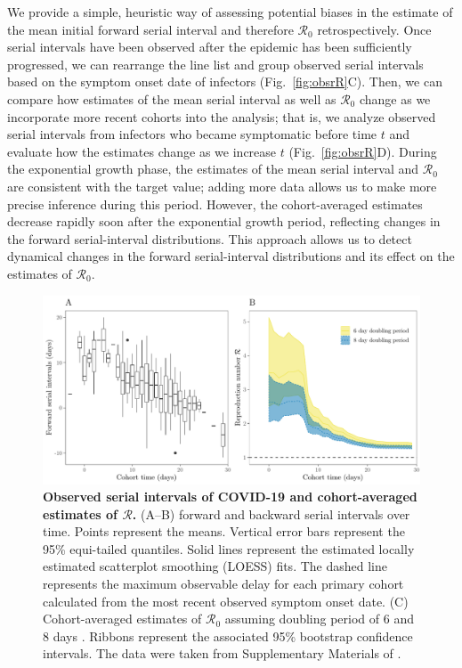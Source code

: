 \documentclass[12pt]{article}
\newcommand{\fref}[1]{Fig.~\ref{fig:#1}}
\newcommand{\Rx}[1]{\ensuremath{{\mathcal R}_{#1}}\xspace}
\newcommand{\Ro}{\Rx{0}}
\newcommand{\RR}{\ensuremath{{\mathcal R}}\xspace}
\begin{document}
We provide a simple, heuristic way of assessing potential biases in the estimate of the mean initial forward serial interval and therefore \Ro retrospectively.
Once serial intervals have been observed after the epidemic has been sufficiently progressed, we can rearrange the line list and group observed serial intervals based on the symptom onset date of infectors (\fref{obsrR}C).
Then, we can compare how estimates of the mean serial interval as well as \Ro change as we incorporate more recent cohorts into the analysis;
that is, we analyze observed serial intervals from infectors who became symptomatic before time $t$ and evaluate how the estimates change as we increase $t$
(\fref{obsrR}D).
During the exponential growth phase, the estimates of the mean serial interval and \Ro are consistent with the target value;
adding more data allows us to make more precise inference during this period.
However, the cohort-averaged estimates decrease rapidly soon after the exponential growth period, reflecting changes in the forward serial-interval distributions.
This approach allows us to detect dynamical changes in the forward serial-interval distributions and its effect on the estimates of \Ro.

\begin{figure}[!th]
\includegraphics[width=\textwidth]{serial_analysis.pdf}
\caption{
\textbf{Observed serial intervals of COVID-19 and cohort-averaged estimates of \RR.}
(A--B) forward and backward serial intervals over time.
Points represent the means. 
Vertical error bars represent the 95\% equi-tailed quantiles.
Solid lines represent the estimated locally estimated scatterplot smoothing (LOESS) fits.
The dashed line represents the maximum observable delay for each primary cohort calculated from the most recent observed symptom onset date.
(C) Cohort-averaged estimates of \Ro assuming doubling period of 6 and 8 days \citep{li2020early, wu2020nowcasting}.
Ribbons represent the associated 95\% bootstrap confidence intervals.
The data were taken from Supplementary Materials of \cite{du2020serial}.
}
\label{fig:du}
\end{figure}
\end{document}
